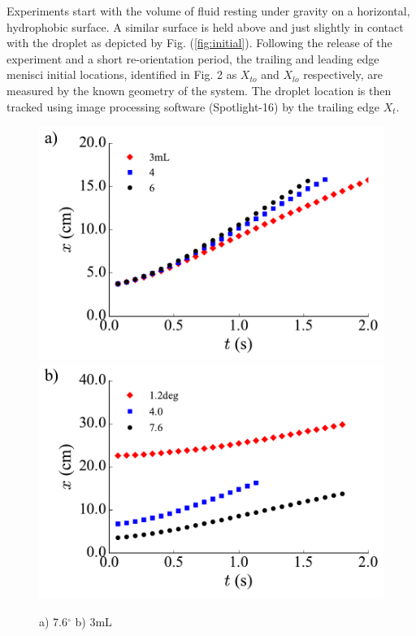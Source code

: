 \documentclass{article}
\begin{document}
Experiments start with the volume of fluid resting under gravity on a horizontal, hydrophobic surface. A similar surface is held above and just slightly in contact with the droplet as depicted by Fig. (\ref{fig:initial}). Following the release of the experiment and a short re-orientation period, the trailing and leading edge menisci initial locations, identified in Fig. 2 as $X_{to}$ and $X_{lo}$ respectively, are measured by the known geometry of the system. The droplet location is then tracked using image processing software (Spotlight-16) by the trailing edge $X_t$.

\begin{figure}[h]
	
	\includegraphics[scale=0.5]{Figures/VaryingVolume}
	\includegraphics[scale=0.5]{Figures/VaryingAngle}
	\caption{a) 7.6$^\circ$ b) 3mL}
	\label{fig:Plot1}
\end{figure}
\end{document}
